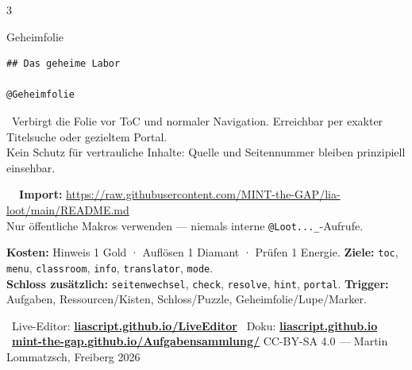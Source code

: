 \documentclass[a4paper,landscape,9pt]{extarticle}
\newcommand{\prevsm}[1]{{\footnotesize\color{muted} #1}}
\newcommand{\sheetfooter}{%
  \vfill
  {\sffamily\scriptsize\color{muted}
  \faInfoCircle~Live-Editor: \href{https://liascript.github.io/LiveEditor/}{\textbf{liascript.github.io/LiveEditor}}\hfill
  \faBook~Doku: \href{https://liascript.github.io}{\textbf{liascript.github.io}}\hfill
  \faGithub~\href{https://mint-the-gap.github.io/Aufgabensammlung/}{\textbf{mint-the-gap.github.io/Aufgabensammlung/}} \quad
  CC-BY-SA 4.0 — Martin Lommatzsch, Freiberg 2026}}
\begin{document}
\begin{multicols}{3}
\begin{lootcard}{Geheimfolie}
\begin{lstlisting}[language=lia]
## Das geheime Labor

@Geheimfolie
\end{lstlisting}
\tcblower
\prevsm{\faSearch~Verbirgt die Folie vor ToC und normaler Navigation. Erreichbar per exakter Titelsuche oder gezieltem Portal.\\[2pt]
{\footnotesize Kein Schutz für vertrauliche Inhalte: Quelle und Seitennummer bleiben prinzipiell einsehbar.}}
\end{lootcard}

\end{multicols}
\endgroup

\noindent
\begin{tcolorbox}[
  enhanced, colback=loottealLt, colframe=lootteal!75,
  boxrule=0.3pt, arc=2pt,
  left=5pt,right=5pt,top=1pt,bottom=1pt,
  before skip=1pt, after skip=0pt
]
\tiny
\begin{minipage}[t]{0.54\linewidth}
\textbf{\color{lootteal}\faDownload~~Import:}
\url{https://raw.githubusercontent.com/MINT-the-GAP/lia-loot/main/README.md}\\[-1pt]
Nur öffentliche Makros verwenden — niemals interne \texttt{@Loot...\_}-Aufrufe.
\end{minipage}\hfill
\begin{minipage}[t]{0.45\linewidth}
\textbf{Kosten:} Hinweis 1 Gold · Auflösen 1 Diamant · Prüfen 1 Energie.\quad
\textbf{Ziele:} \texttt{toc}, \texttt{menu}, \texttt{classroom}, \texttt{info}, \texttt{translator}, \texttt{mode}.\\[-1pt]
\textbf{Schloss zusätzlich:} \texttt{seitenwechsel}, \texttt{check}, \texttt{resolve}, \texttt{hint}, \texttt{portal}.\quad
\textbf{Trigger:} Aufgaben, Ressourcen/Kisten, Schloss/Puzzle, Geheimfolie/Lupe/Marker.
\end{minipage}
\end{tcolorbox}

\sheetfooter

\newpage
\end{document}
